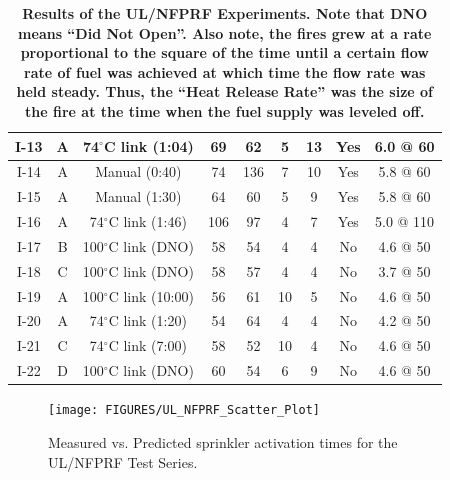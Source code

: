 \begin{table}[h]
\begin{center}
\begin{tabular}{|c||c|c|c|c|c|c|c|c|}
I-13  & A  & 74$^\circ$C link (1:04)    & 69   & 62                             & 5    & 13     & Yes  & 6.0 @ 60  \\ \hline
I-14  & A  & Manual (0:40)              & 74   & 136                            & 7    & 10     & Yes  & 5.8 @ 60  \\ \hline
I-15  & A  & Manual (1:30)              & 64   & 60                             & 5    & 9      & Yes  & 5.8 @ 60  \\ \hline
I-16  & A  & 74$^\circ$C link (1:46)    & 106  & 97                             & 4    & 7      & Yes  & 5.0 @ 110 \\ \hline
\hline
I-17  & B  & 100$^\circ$C link (DNO)    & 58   & 54                             & 4    & 4      & No   & 4.6 @ 50 \\ \hline
I-18  & C  & 100$^\circ$C link (DNO)    & 58   & 57                             & 4    & 4      & No   & 3.7 @ 50 \\ \hline
I-19  & A  & 100$^\circ$C link (10:00)  & 56   & 61                             & 10   & 5      & No   & 4.6 @ 50 \\ \hline
I-20  & A  & 74$^\circ$C link (1:20)    & 54   & 64                             & 4    & 4      & No   & 4.2 @ 50 \\ \hline
I-21  & C  & 74$^\circ$C link (7:00)    & 58   & 52                             & 10   & 4      & No   & 4.6 @ 50 \\ \hline
I-22  & D  & 100$^\circ$C link (DNO)    & 60   & 54                             & 6    & 9      & No   & 4.6 @ 50 \\ \hline
\end{tabular}
\end{center}
\caption[Results of the UL/NFPRF Experiments.]
{\bf Results of the UL/NFPRF Experiments. Note that DNO means
``Did Not Open''. Also note, the fires grew at a rate proportional
to the square of the time until a certain flow rate of fuel was achieved
at which time the flow rate was held steady. Thus, the ``Heat Release Rate''
was the size of the fire at the time when the fuel supply was leveled off.}
\label{ULmatrix}
\end{table}


\begin{figure}[ht]
\texttt{[image: FIGURES/UL\_NFPRF\_Scatter\_Plot]}
\caption{Measured vs. Predicted sprinkler activation times for the UL/NFPRF Test Series.}
\label{UL_NFPRF_Scatter_Plot}
\end{figure}
